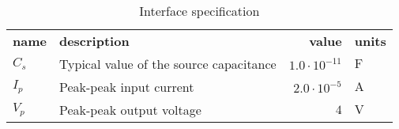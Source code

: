 \begin{table}[H]
\centering
\begin{tabular}[c]{llrl}
\textbf{name} & \textbf{description} & \textbf{value} & \textbf{units} \\ 
\rowcolor{myyellow}
$C_{s}$ &\small{Typical value of the source capacitance} &$1.0 \cdot 10^{-11}$ &$\mathrm{F}$ \\ 
$I_{p}$ &\small{Peak-peak input current} &$2.0 \cdot 10^{-5}$ &$\mathrm{A}$ \\ 
\rowcolor{myyellow}
$V_{p}$ &\small{Peak-peak output voltage} &$4$ &$\mathrm{V}$ \\ 
\end{tabular}
\caption{Interface specification}
\end{table}


